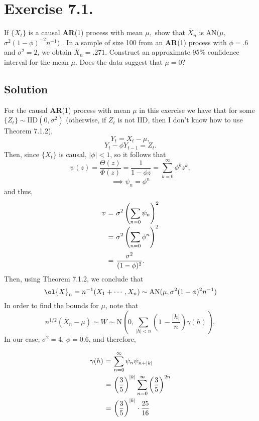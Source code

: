 \section*{Exercise 7.1.}


If $\{X_{t} \}$ is a causal \textbf{AR}(1) process with mean $\mu,$ show that ${\bar{X}}_{n}$ is $\mathrm{A N} ( \mu,$  $\sigma^{2} ( 1-\phi)^{-2} n^{-1} )$ . In a sample of size 100 from an \textbf{AR}(1) process with $\phi=. 6$ and $\sigma^{2}=2$, we obtain $\bar{X}_{n}=. 2 7 1$. Construct an approximate 95\% confidence interval for the mean $\mu$. Does the data suggest that $\mu=0$?

\subsection*{Solution}

For the causal \textbf{AR}(1) process with mean $\mu$ in this exercise we have that for some $\{Z_t\} \sim \mbox{IID}(0,\sigma^2)$ (otherwise, if $Z_t$ is not IID, then I don't know how to use Theorem 7.1.2),
\[ Y_t = X_t - \mu, \]
\[ Y_t - \phi Y_{t-1} = Z_t. \]
Then, since $\{X_t\}$ is causal, $|\phi| < 1$, so it follows that
\[ \psi(z) = \frac{\Theta(z)}{\Phi(z)} = \frac{1}{1-\phi z} = \sum_{k = 0}^{\infty} \phi^k z^k, \]
\[ \implies \psi_n = \phi^n \]
and thus,
\[ \everymath{\displaystyle}
\arraycolsep=1.8pt\def\arraystretch{2.5}
\begin{array}{rcl}
    v & = & \sigma^2 \left( \sum_{n = 0} \psi_n \right)^2\\
    & = & \sigma^2 \left( \sum_{n = 0} \phi^n \right)^2\\
    & = & \frac{\sigma^2}{(1-\phi)^2}.
\end{array}  \]
Then, using Theorem 7.1.2, we conclude that
\[ \ol{X}_n = n^{-1}(X_1+\cdots,X_n) \sim \mbox{AN}(\mu, \sigma^2(1-\phi)^2 n^{-1}) \]
In order to find the bounds for $\mu$, note that
\[ n^{1/2}(\overline{{{X}}}_{n}-\mu)\sim W \sim \mathrm{N}\left(0,\sum_{|h|<n}\left(1\,-\frac{|h|}{n}\right)\gamma(h)\right),
\]
In our case, $\sigma^2 = 4$, $\phi = 0.6$, and therefore,
\[ \everymath{\displaystyle}
\arraycolsep=1.8pt\def\arraystretch{2.5}
\begin{array}{rcl}
    \gamma(h) & = & \sum_{n = 0}^{\infty} \psi_n \psi_{n+|k|}\\
    & = & \left( \frac{3}{5} \right)^{|k|}  \sum_{n = 0}^{\infty} \left( \frac{3}{5} \right)^{2n}\\
    & = & \left( \frac{3}{5} \right)^{|k|}\cdot \frac{25}{16}
\end{array}  \]

